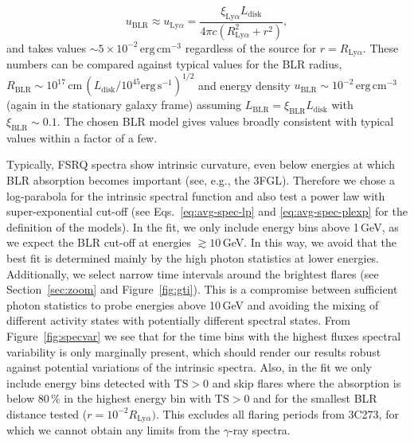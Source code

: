 \documentclass[twocolumn,linenumbers]{aastex62}
\newcommand{\gray}{$\gamma$-ray\xspace}
\begin{document}
    \begin{equation}
        u_\mathrm{BLR} \approx u_{\mathrm{Ly}\alpha}= \frac{\xi_{\mathrm{Ly}\alpha}L_\mathrm{disk}}{4\pi c(R_{\mathrm{Ly}\alpha}^2 + r^2)},
        \label{eq:u-blr}
    \end{equation}
and takes values $\sim 5\times10^{-2}\,\mathrm{erg}\,\mathrm{cm}^{-3}$ regardless of the source for $r = R_{\mathrm{Ly}\alpha}$.
These numbers can be compared against typical values for the BLR radius, $R_\mathrm{BLR} \sim 10^{17}\,\mathrm{cm}\, (L_\mathrm{disk} / 10^{45} \mathrm{erg}\,\mathrm{s}^{-1})^{1/2}$ \citep[e.g.][]{2007ApJ...659..997K,2009ApJ...697..160B} and energy density $u_\mathrm{BLR} \sim 10^{-2}\,\mathrm{erg}\,\mathrm{cm}^{-3} $ (again in the stationary galaxy frame) assuming  $L_\mathrm{BLR} = \xi_\mathrm{BLR} L_\mathrm{disk}$ with $\xi_\mathrm{BLR}\sim 0.1$. 
The chosen BLR model gives values broadly consistent with typical values within a factor of a few.

Typically, FSRQ spectra show intrinsic curvature, even below energies at which BLR absorption becomes important (see, e.g., the 3FGL). Therefore we chose a log-parabola for the intrinsic spectral function and also test a power law with super-exponential cut-off (see Eqs.~\ref{eq:avg-spec-lp} and \ref{eq:avg-spec-plexp} for the definition of the models). 
In the fit, we only include energy bins above 1\,GeV, as we expect the BLR cut-off at energies $\gtrsim 10\,$GeV. In this way, we avoid that the best fit is determined mainly by the high photon statistics at lower energies.
Additionally, we select narrow time intervals around the brightest flares (see Section~\ref{sec:zoom} and Figure~\ref{fig:gti}).
This is a compromise between sufficient photon statistics to probe energies above 10\,GeV and avoiding the mixing of different activity states with potentially different spectral states. 
From Figure~\ref{fig:specvar} we see that for the time bins with the highest fluxes spectral variability is only marginally present, which should render our results robust against potential variations of the intrinsic spectra. 
Also, in the fit we only include energy bins detected with $\mathrm{TS} > 0$ and skip flares where the absorption is below 80\,\% in the highest energy bin with $\mathrm{TS} > 0$ and for the smallest BLR distance tested ($r = 10^{-2}R_{\mathrm{Ly}\alpha})$. 
This excludes all flaring periods from 3C273, for which we cannot obtain any limits from the \gray spectra.
\end{document}
